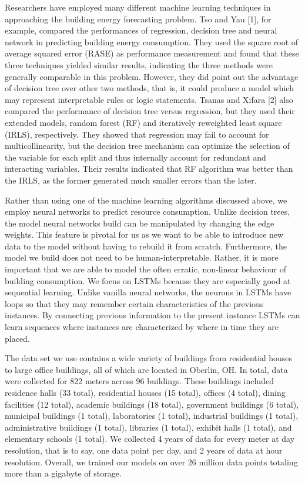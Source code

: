 \documentclass[letterpaper, 11 pt, conference]{ieeeconf}  %
\begin{document}
Researchers have employed many different machine learning techniques in approaching the building energy forecasting problem. Tso and Yau [1], for example, compared the performances of regression, decision tree and neural network in predicting building energy consumption. They used the square root of average squared error (RASE) as performance measurement and found that these three techniques yielded similar results, indicating the three methods were generally comparable in this problem. However, they did point out the advantage of decision tree over other two methods, that is, it could produce a model which may represent interpretable rules or logic statements. Tsanas and Xifara [2] also compared the performance of decision tree versus regression, but they used their extended models, random forest (RF) and iteratively reweighted least square (IRLS), respectively. They showed that regression may fail to account for multicollinearity, but the decision tree mechanism can optimize the selection of the variable for each split and thus internally account for redundant and interacting variables. Their results indicated that RF algorithm was better than the IRLS, as the former generated much smaller errors than the later.

Rather than using one of the machine learning algorithms discussed above, we employ neural networks to predict resource consumption. Unlike decision trees, the model neural networks build can be manipulated by changing the edge weights. This feature is pivotal for us as we want to be able to introduce new data to the model without having to rebuild it from scratch. Furthermore, the model we build does not need to be human-interpretable. Rather, it is more important that we are able to model the often erratic, non-linear behaviour of building consumption. We focus on LSTMs because they are especially good at sequential learning. Unlike vanilla neural networks, the neurons in LSTMs have loops so that they may remember certain characteristics of the previous instances. By connecting previous information to the present instance LSTMs can learn sequences where instances are characterized by where in time they are placed.

The data set we use contains a wide variety of buildings from residential houses to large office buildings, all of which are located in Oberlin, OH. In total, data were collected for 822 meters across 96 buildings. These buildings included residence halls (33 total), residential houses (15 total), offices (4 total), dining facilities (12 total), academic buildings (18 total), government buildings (6 total), municipal buildings (1 total), laboratories (1 total), industrial buildings (1 total), administrative buildings (1 total), libraries (1 total), exhibit halls (1 total), and elementary schools (1 total). We collected 4 years of data for every meter at day resolution, that is to say, one data point per day, and 2 years of data at hour resolution. Overall, we trained our models on over 26 million data points totaling more than a gigabyte of storage.
\end{document}
